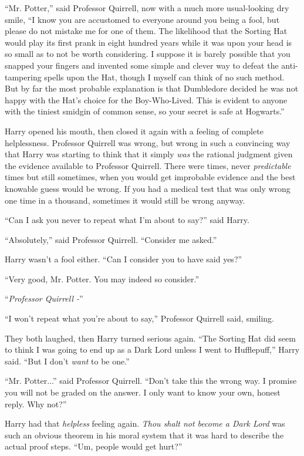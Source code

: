 ``Mr. Potter,'' said Professor Quirrell, now with a much more usual-looking dry smile, ``I know you are accustomed to everyone around you being a fool, but please do not mistake me for one of them. The likelihood that the Sorting Hat would play its first prank in eight hundred years while it was upon your head is so small as to not be worth considering. I suppose it is barely possible that you snapped your fingers and invented some simple and clever way to defeat the anti-tampering spells upon the Hat, though I myself can think of no such method. But by far the most probable explanation is that Dumbledore decided he was not happy with the Hat's choice for the Boy-Who-Lived. This is evident to anyone with the tiniest smidgin of common sense, so your secret is safe at Hogwarts.''

Harry opened his mouth, then closed it again with a feeling of complete helplessness. Professor Quirrell was wrong, but wrong in such a convincing way that Harry was starting to think that it simply \emph{was} the rational judgment given the evidence available to Professor Quirrell. There were times, never \emph{predictable} times but still sometimes, when you would get improbable evidence and the best knowable guess would be wrong. If you had a medical test that was only wrong one time in a thousand, sometimes it would still be wrong anyway.

``Can I ask you never to repeat what I'm about to say?'' said Harry.

``Absolutely,'' said Professor Quirrell. ``Consider me asked.''

Harry wasn't a fool either. ``Can I consider you to have said yes?''

``Very good, Mr. Potter. You may indeed so consider.''

``\emph{Professor Quirrell -}''

``I won't repeat what you're about to say,'' Professor Quirrell said, smiling.

They both laughed, then Harry turned serious again. ``The Sorting Hat did seem to think I was going to end up as a Dark Lord unless I went to Hufflepuff,'' Harry said. ``But I don't \emph{want} to be one.''

``Mr. Potter...'' said Professor Quirrell. ``Don't take this the wrong way. I promise you will not be graded on the answer. I only want to know your own, honest reply. Why not?''

Harry had that \emph{helpless} feeling again. \emph{Thou shalt not become a Dark Lord} was such an obvious theorem in his moral system that it was hard to describe the actual proof steps. ``Um, people would get hurt?''


